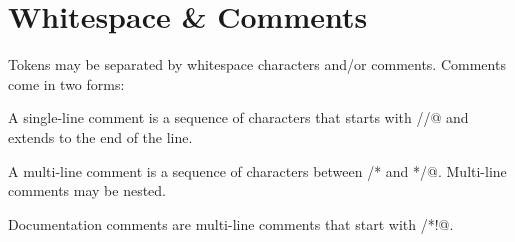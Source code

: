 \section{Whitespace \& Comments}\label{sec:whitespacecomments}

Tokens may be separated by whitespace characters and/or comments. Comments come in two forms: 

A single-line comment is a sequence of characters that starts with \lstinline@//@ and extends to the end of the line. 

A multi-line comment is a sequence of characters between \lstinline@/* and */@. Multi-line comments may be nested. 

Documentation comments are multi-line comments that start with \lstinline@/*!@. 





